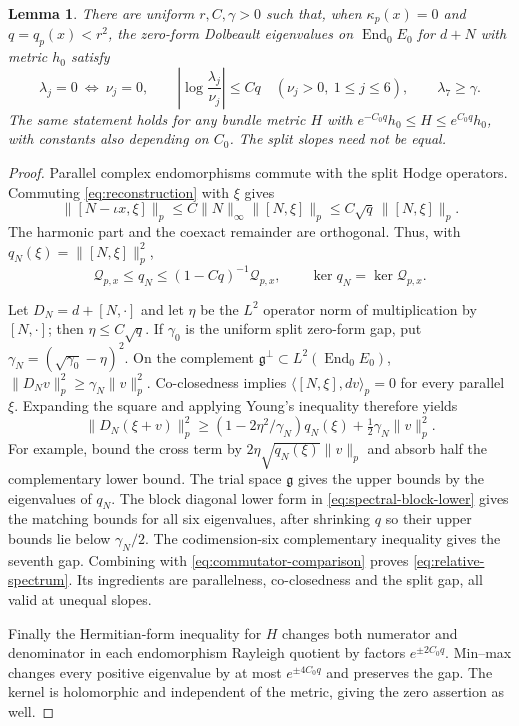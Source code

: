 \documentclass[11pt]{amsart}
\newtheorem{lemma}[theorem]{Lemma}
\theoremstyle{definition}
\theoremstyle{remark}
\newcommand{\End}{\operatorname{End}}
\newcommand{\cQ}{\mathcal Q}
\begin{document}
\begin{lemma}\label{lem:relative-spectrum}
There are uniform $r,C,\gamma>0$ such that, when
$\kappa_p(x)=0$ and $q=q_p(x)<r^2$, the zero-form Dolbeault
eigenvalues on $\End_0E_0$ for $d+N$ with metric $h_0$ satisfy
\begin{equation}\label{eq:relative-spectrum}
 \lambda_j=0\ \Longleftrightarrow\ \nu_j=0,\qquad
 \left|\log\frac{\lambda_j}{\nu_j}\right|\le Cq
 \quad(\nu_j>0,\ 1\le j\le6),\qquad \lambda_7\ge\gamma.
\end{equation}
The same statement holds for any bundle metric $H$ with
$e^{-C_0q}h_0\le H\le e^{C_0q}h_0$, with constants also depending
on $C_0$. The split slopes need not be equal.
\end{lemma}
\begin{proof}
Parallel complex endomorphisms commute with the split Hodge operators.
Commuting \eqref{eq:reconstruction} with $\xi$ gives
\[
 \|[N-\iota x,\xi]\|_p
 \le C\|N\|_\infty\|[N,\xi]\|_p
 \le C\sqrt q\,\|[N,\xi]\|_p.
\]
The harmonic part and the coexact remainder are orthogonal. Thus, with
$q_N(\xi)=\|[N,\xi]\|_p^2$,
\begin{equation}\label{eq:commutator-comparison}
 \cQ_{p,x}\le q_N\le(1-Cq)^{-1}\cQ_{p,x},
 \qquad \ker q_N=\ker\cQ_{p,x}.
\end{equation}

Let $D_N=d+[N,\cdot]$ and let $\eta$ be the $L^2$ operator norm
of multiplication by $[N,\cdot]$; then $\eta\le C\sqrt q$.
If $\gamma_0$ is the uniform split zero-form gap, put
$\gamma_N=(\sqrt{\gamma_0}-\eta)^2$. On the complement
$\mathfrak g^\perp\subset L^2(\End_0E_0)$,
$\|D_Nv\|_p^2\ge\gamma_N\|v\|_p^2$.
Co-closedness implies $\langle[N,\xi],dv\rangle_p=0$ for every
parallel $\xi$. Expanding the square and applying Young's inequality
therefore yields
\begin{equation}\label{eq:spectral-block-lower}
 \|D_N(\xi+v)\|_p^2
 \ge(1-2\eta^2/\gamma_N)q_N(\xi)
          +\tfrac12\gamma_N\|v\|_p^2.
\end{equation}
For example, bound the cross term by
$2\eta\sqrt{q_N(\xi)}\|v\|_p$ and absorb half the complementary
lower bound. The trial space $\mathfrak g$ gives the upper bounds
by the eigenvalues of $q_N$. The block diagonal lower form in
\eqref{eq:spectral-block-lower} gives the matching bounds for all
six eigenvalues, after shrinking $q$ so their upper bounds lie below
$\gamma_N/2$. The codimension-six complementary inequality gives the
seventh gap. Combining with \eqref{eq:commutator-comparison} proves
\eqref{eq:relative-spectrum}. Its ingredients are parallelness,
co-closedness and the split gap, all valid at unequal slopes.

Finally the Hermitian-form inequality for $H$ changes both numerator
and denominator in each endomorphism Rayleigh quotient by factors
$e^{\pm2C_0q}$. Min--max changes every positive eigenvalue by at most
$e^{\pm4C_0q}$ and preserves the gap. The kernel is holomorphic and
independent of the metric, giving the zero assertion as well.
\end{proof}
\end{document}
